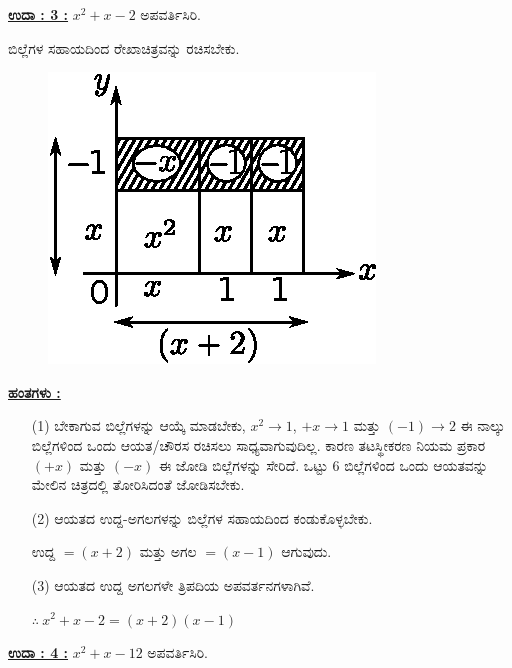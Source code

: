 \noindent
{\textbf{\underline{ಉದಾ : 3 :}}} $x^2 + x - 2$ ಅಪವರ್ತಿಸಿರಿ. 

ಬಿಲ್ಲೆಗಳ ಸಹಾಯದಿಂದ ರೇಖಾಚಿತ್ರವನ್ನು ರಚಿಸಬೇಕು.
\begin{figure}[H]
\centering
\includegraphics[scale=0.8]{src/figure/chap3/fig3-41.eps}
\end{figure}

\eject

\noindent
{\textbf{\underline{ಹಂತಗಳು :}}}
\begin{itemize}
\item [(1)] ಬೇಕಾಗುವ ಬಿಲ್ಲೆಗಳನ್ನು ಆಯ್ಕೆ ಮಾಡಬೇಕು, $x^2 \rightarrow 1$, $+x \rightarrow 1$ ಮತ್ತು $(-1) \rightarrow 2$ ಈ ನಾಲ್ಕು ಬಿಲ್ಲೆಗಳಿಂದ ಒಂದು ಆಯತ/ಚೌರಸ ರಚಿಸಲು ಸಾಧ್ಯವಾಗುವುದಿಲ್ಲ. ಕಾರಣ ತಟಸ್ಥೀಕರಣ ನಿಯಮ ಪ್ರಕಾರ $(+x)$ ಮತ್ತು $(-x)$ ಈ ಜೋಡಿ ಬಿಲ್ಲೆಗಳನ್ನು ಸೇರಿದೆ. ಒಟ್ಟು 6 ಬಿಲ್ಲೆಗಳಿಂದ ಒಂದು ಆಯತವನ್ನು ಮೇಲಿನ ಚಿತ್ರದಲ್ಲಿ ತೋರಿಸಿದಂತೆ ಜೋಡಿಸಬೇಕು. 

\item [(2)] ಆಯತದ ಉದ್ದ-ಅಗಲಗಳನ್ನು ಬಿಲ್ಲೆಗಳ ಸಹಾಯದಿಂದ ಕಂಡುಕೊಳ್ಳಬೇಕು. 

ಉದ್ದ $= (x+2)$ ಮತ್ತು ಅಗಲ $= (x-1)$ ಆಗುವುದು. 

\item [(3)] ಆಯತದ ಉದ್ದ ಅಗಲಗಳೇ ತ್ರಿಪದಿಯ ಅಪವರ್ತನಗಳಾಗಿವೆ.

$\therefore~ x^2 + x - 2 = (x+2)(x-1)$
\end{itemize}

\medskip

\noindent
{\textbf{\underline{ಉದಾ : 4 :}}} $x^2 + x - 12$ ಅಪವರ್ತಿಸಿರಿ. 

